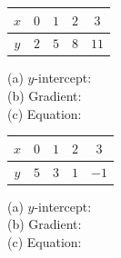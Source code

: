 \documentclass[11pt]{article}
\newcommand{\ans}{\hrulefill}
\begin{document}
\begin{center}
\begin{minipage}{0.48\linewidth}
\centering
\begin{tabular}{|c|c|c|c|c|}
\hline
$x$ & $0$ & $1$ & $2$ & $3$ \\\hline
$y$ & $2$ & $5$ & $8$ & $11$ \\\hline
\end{tabular}

\vspace{0.6em}
(a) $y$-intercept: \ans \\[0.5em]
(b) Gradient: \ans \\[0.5em]
(c) Equation: \ans
\end{minipage}
\hfill
\begin{minipage}{0.48\linewidth}
\centering
\begin{tabular}{|c|c|c|c|c|}
\hline
$x$ & $0$ & $1$ & $2$ & $3$ \\\hline
$y$ & $5$ & $3$ & $1$ & $-1$ \\\hline
\end{tabular}

\vspace{0.6em}
(a) $y$-intercept: \ans \\[0.5em]
(b) Gradient: \ans \\[0.5em]
(c) Equation: \ans
\end{minipage}
\end{center}
\end{document}
